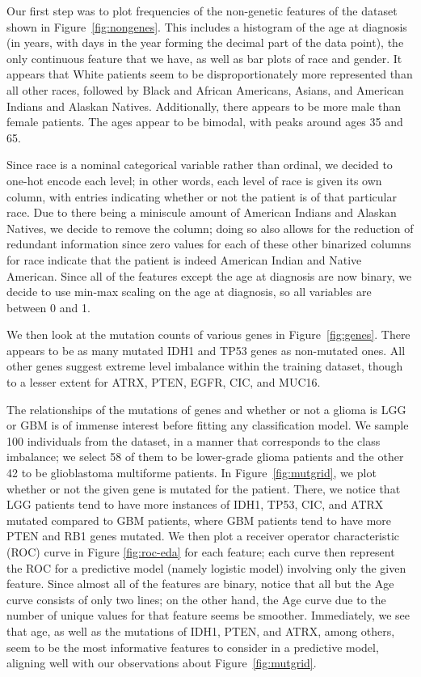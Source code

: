\documentclass[12pt]{article}
\newtheorem{Proof of Lemma}{Proof of Lemma}
\begin{document}
Our first step was to plot frequencies of the non-genetic features of the dataset
shown in Figure~\ref{fig:nongenes}. This includes a histogram of the age at diagnosis (in years,
with days in the year forming the decimal part of the data point), the only continuous
feature that we have, as well as bar plots of race and gender. It appears that White patients seem to be disproportionately more 
represented than all other races, followed by Black and African Americans, Asians, and 
American Indians and Alaskan Natives. Additionally, there appears to be more male than 
female patients. The ages appear to be bimodal, with peaks around ages 35 and 65.

Since race is a nominal categorical variable rather than ordinal, we decided to one-hot encode
each level; in other words, each level of race is given its own column, with entries indicating 
whether or not the patient is of that particular race. Due to there being a miniscule 
amount of American Indians and Alaskan Natives, we decide to remove the column; doing so also allows 
for the reduction of redundant information since zero values for each of these other binarized columns for race 
indicate that the patient is indeed American Indian and Native American. Since all of the features
except the age at diagnosis are now binary, we decide to use min-max scaling on the age at diagnosis,
so all variables are between 0 and 1. 

We then look at the mutation counts of various genes in Figure~\ref{fig:genes}. There appears to be as 
many mutated IDH1 and TP53 genes as non-mutated ones. All other genes suggest extreme level imbalance within the 
training dataset, though to a lesser extent for ATRX, PTEN, EGFR, CIC, and MUC16.

The relationships of the mutations of genes and whether or not a glioma is LGG or GBM is of immense interest before 
fitting any classification model. We sample 100 individuals from the dataset, in a manner that corresponds to the class imbalance; we select 58 of them to
be lower-grade glioma patients and the other 42 to be glioblastoma multiforme patients. In Figure~\ref{fig:mutgrid}, we plot whether or not
the given gene is mutated for the patient. There, we notice that LGG patients tend to have more instances of IDH1, TP53, CIC, and ATRX mutated 
compared to GBM patients, where GBM patients tend to have more PTEN and RB1 genes mutated. We then plot a receiver operator characteristic (ROC) curve in
Figure \ref{fig:roc-eda} for 
each feature; each curve then represent the ROC for a predictive model (namely logistic model) involving only the given feature. 
Since almost all of the features are binary, notice that all but the Age curve consists of only two lines; on the other hand, the 
Age curve due to the number of unique values for that feature seems be smoother. Immediately, we see that age, as well as the mutations of IDH1, PTEN,
and ATRX, among others, seem to be the most informative features to consider in a predictive model, aligning well with our observations
about Figure~\ref{fig:mutgrid}.
\end{document}

